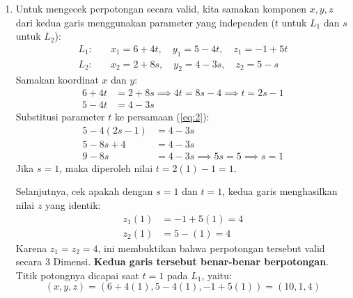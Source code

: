 \documentclass[11pt,letterpaper]{article}
\begin{document}
\begin{enumerate}
  \item Untuk mengecek perpotongan secara valid, kita samakan komponen $x, y, z$ dari kedua garis menggunakan parameter yang independen ($t$ untuk $L_1$ dan $s$ untuk $L_2$):
        \begin{align*}
          L_1: & \quad x_1 = 6 + 4t, \quad y_1 = 5 - 4t, \quad z_1 = -1 + 5t \\
          L_2: & \quad x_2 = 2 + 8s, \quad y_2 = 4 - 3s, \quad z_2 = 5 - s
        \end{align*}
        Samakan koordinat $x$ dan $y$:
        \begin{align}
          6 + 4t & = 2 + 8s \implies 4t = 8s - 4 \implies t = 2s - 1 \label{eq:1} \\
          5 - 4t & = 4 - 3s \label{eq:2}
        \end{align}
        Substitusi parameter $t$ ke persamaan (\ref{eq:2}):
        \begin{align*}
          5 - 4(2s - 1) & = 4 - 3s                                \\
          5 - 8s + 4    & = 4 - 3s                                \\
          9 - 8s        & = 4 - 3s \implies 5s = 5 \implies s = 1
        \end{align*}
        Jika $s = 1$, maka diperoleh nilai $t = 2(1) - 1 = 1$.

        Selanjutnya, cek apakah dengan $s=1$ dan $t=1$, kedua garis menghasilkan nilai $z$ yang identik:
        \begin{align*}
          z_1(1) & = -1 + 5(1) = 4 \\
          z_2(1) & = 5 - (1) = 4
        \end{align*}
        Karena $z_1 = z_2 = 4$, ini membuktikan bahwa perpotongan tersebut valid secara 3 Dimensi. \textbf{Kedua garis tersebut benar-benar berpotongan}. Titik potongnya dicapai saat $t=1$ pada $L_1$, yaitu:
        \[ (x, y, z) = (6+4(1), 5-4(1), -1+5(1)) = (10, 1, 4) \]


\end{enumerate}
\end{document}
